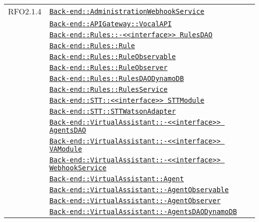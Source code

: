 \begin{longtable}{|>{\centering}m{3cm}|m{10cm}<{\centering}|}
RFO2.1.4 & \hyperref[Back-end::AdministrationWebhookService]{\texttt{Back-end::AdministrationWebhookService}}\\
& \hyperref[Back-end::APIGateway::VocalAPI]{\texttt{Back-end::APIGateway::VocalAPI}}\\
& \hyperref[Back-end::Rules::<<interface>> RulesDAO]{\texttt{Back-end::Rules::-\linebreak <<interface>> RulesDAO}}\\
& \hyperref[Back-end::Rules::Rule]{\texttt{Back-end::Rules::Rule}}\\
& \hyperref[Back-end::Rules::RuleObservable]{\texttt{Back-end::Rules::RuleObservable}}\\
& \hyperref[Back-end::Rules::RuleObserver]{\texttt{Back-end::Rules::RuleObserver}}\\
& \hyperref[Back-end::Rules::RulesDAODynamoDB]{\texttt{Back-end::Rules::RulesDAODynamoDB}}\\
& \hyperref[Back-end::Rules::RulesService]{\texttt{Back-end::Rules::RulesService}}\\
& \hyperref[Back-end::STT::<<interface>> STTModule]{\texttt{Back-end::STT::<<interface>> STTModule}}\\
& \hyperref[Back-end::STT::STTWatsonAdapter]{\texttt{Back-end::STT::STTWatsonAdapter}}\\
& \hyperref[Back-end::VirtualAssistant::<<interface>> AgentsDAO]{\texttt{Back-end::VirtualAssistant::-\linebreak <<interface>> AgentsDAO}}\\
& \hyperref[Back-end::VirtualAssistant::<<interface>> VAModule]{\texttt{Back-end::VirtualAssistant::-\linebreak <<interface>> VAModule}}\\
& \hyperref[Back-end::VirtualAssistant::<<interface>> WebhookService]{\texttt{Back-end::VirtualAssistant::-\linebreak <<interface>> WebhookService}}\\
& \hyperref[Back-end::VirtualAssistant::Agent]{\texttt{Back-end::VirtualAssistant::Agent}}\\
& \hyperref[Back-end::VirtualAssistant::AgentObservable]{\texttt{Back-end::VirtualAssistant::-\linebreak AgentObservable}}\\
& \hyperref[Back-end::VirtualAssistant::AgentObserver]{\texttt{Back-end::VirtualAssistant::-\linebreak AgentObserver}}\\
& \hyperref[Back-end::VirtualAssistant::AgentsDAODynamoDB]{\texttt{Back-end::VirtualAssistant::-\linebreak AgentsDAODynamoDB}}\\

\end{longtable}
